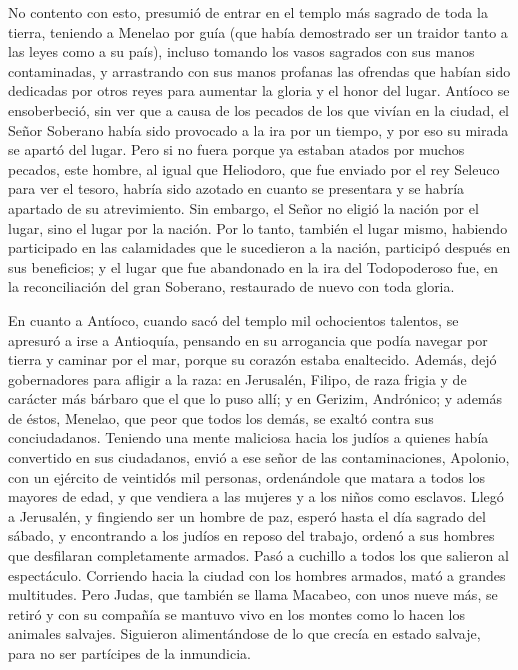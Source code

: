  No contento con esto, presumió de entrar en el templo
más sagrado de toda la tierra, teniendo a Menelao por guía (que había
demostrado ser un traidor tanto a las leyes como a su país),
 incluso tomando los vasos sagrados con sus manos
contaminadas, y arrastrando con sus manos profanas las ofrendas que
habían sido dedicadas por otros reyes para aumentar la gloria y el honor
del lugar.  Antíoco se ensoberbeció, sin ver que a causa
de los pecados de los que vivían en la ciudad, el Señor Soberano había
sido provocado a la ira por un tiempo, y por eso su mirada se apartó del
lugar.  Pero si no fuera porque ya estaban atados por
muchos pecados, este hombre, al igual que Heliodoro, que fue enviado por
el rey Seleuco para ver el tesoro, habría sido azotado en cuanto se
presentara y se habría apartado de su atrevimiento.  Sin
embargo, el Señor no eligió la nación por el lugar, sino el lugar por la
nación.  Por lo tanto, también el lugar mismo, habiendo
participado en las calamidades que le sucedieron a la nación, participó
después en sus beneficios; y el lugar que fue abandonado en la ira del
Todopoderoso fue, en la reconciliación del gran Soberano, restaurado de
nuevo con toda gloria.

 En cuanto a Antíoco, cuando sacó del templo mil
ochocientos talentos, se apresuró a irse a Antioquía, pensando en su
arrogancia que podía navegar por tierra y caminar por el mar, porque su
corazón estaba enaltecido.  Además, dejó gobernadores
para afligir a la raza: en Jerusalén, Filipo, de raza frigia y de
carácter más bárbaro que el que lo puso allí;  y en
Gerizim, Andrónico; y además de éstos, Menelao, que peor que todos los
demás, se exaltó contra sus conciudadanos. Teniendo una mente maliciosa
hacia los judíos a quienes había convertido en sus ciudadanos,
 envió a ese señor de las contaminaciones, Apolonio, con
un ejército de veintidós mil personas, ordenándole que matara a todos
los mayores de edad, y que vendiera a las mujeres y a los niños como
esclavos.  Llegó a Jerusalén, y fingiendo ser un hombre
de paz, esperó hasta el día sagrado del sábado, y encontrando a los
judíos en reposo del trabajo, ordenó a sus hombres que desfilaran
completamente armados.  Pasó a cuchillo a todos los que
salieron al espectáculo. Corriendo hacia la ciudad con los hombres
armados, mató a grandes multitudes.  Pero Judas, que
también se llama Macabeo, con unos nueve más, se retiró y con su
compañía se mantuvo vivo en los montes como lo hacen los animales
salvajes. Siguieron alimentándose de lo que crecía en estado salvaje,
para no ser partícipes de la inmundicia.

